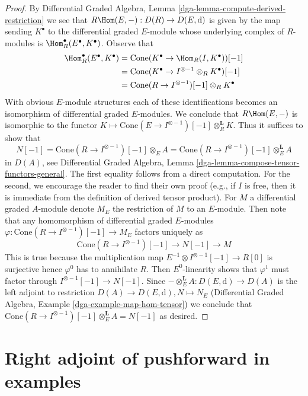 \begin{proof}
\medskip\noindent
By Differential Graded Algebra, Lemma
\ref{dga-lemma-compute-derived-restriction}
we see that $R\Hom(E, -) : D(R) \to D(E, \text{d})$ is given by the map
sending $K^\bullet$ to the differential graded $E$-module whose underlying
complex of $R$-modules is $\Hom^\bullet_R(E^\bullet, K^\bullet)$.
Observe that
\begin{align*}
\Hom^\bullet_R(E^\bullet, K^\bullet)
& =
\text{Cone}(K^\bullet \to \Hom_R(I, K^\bullet))[-1] \\
& =
\text{Cone}(K^\bullet \to I^{\otimes -1} \otimes_R K^\bullet)[-1] \\
& =
\text{Cone}(R \to I^{\otimes -1})[-1] \otimes_R K^\bullet
\end{align*}
With obvious $E$-module structures each of these identifications
becomes an isomorphism of differential graded $E$-modules. We conclude
that $R\Hom(E, -)$ is isomorphic to the functor
$K \mapsto \text{Cone}(E \to I^{\otimes -1})[-1] \otimes_R^\mathbf{L} K$.
Thus it suffices to show that
$$
N[-1] = \text{Cone}(R \to I^{\otimes -1})[-1] \otimes_E A =
\text{Cone}(R \to I^{\otimes -1})[-1] \otimes_E^\mathbf{L} A
$$
in $D(A)$, see Differential Graded Algebra, Lemma
\ref{dga-lemma-compose-tensor-functors-general}.
The first equality follows from a direct computation.
For the second, we encourage the reader to find their
own proof (e.g., if $I$ is free, then it is immediate from
the definition of derived tensor product).
For $M$ a differential graded $A$-module
denote $M_E$ the restriction of $M$ to an $E$-module.
Then note that any homomorphism of differential graded $E$-modules
$\varphi : \text{Cone}(R \to I^{\otimes -1})[-1] \to M_E$
factors uniquely as
$$
\text{Cone}(R \to I^{\otimes -1})[-1]  \to N[-1] \to M
$$
This is true because the multiplication map
$E^{-1} \otimes I^{\otimes -1}[-1] \to R[0]$ is surjective
hence $\varphi^0$ has to annihilate $R$. Then $E^0$-linearity
shows that $\varphi^1$ must factor through $I^{\otimes -1}[-1] \to N[-1]$.
Since $- \otimes_E^\mathbf{L} A : D(E, \text{d}) \to D(A)$
is the left adjoint to restriction
$D(A) \to D(E, \text{d}), N \mapsto N_E$
(Differential Graded Algebra, Example \ref{dga-example-map-hom-tensor})
we conclude that
$\text{Cone}(R \to I^{\otimes -1})[-1] \otimes_E^\mathbf{L} A = N[-1]$
as desired.
\end{proof}





\section{Right adjoint of pushforward in examples}
\label{section-examples}

